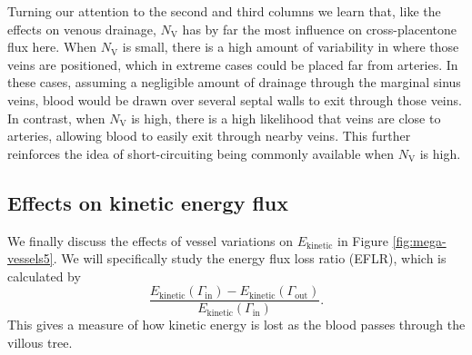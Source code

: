             Turning our attention to the second and third columns we learn that, like the effects on venous drainage, $N_\text{V}$ has by far the most influence on cross-placentone flux here. When $N_\text{V}$ is small, there is a high amount of variability in where those veins are positioned, which in extreme cases could be placed far from arteries. In these cases, assuming a negligible amount of drainage through the marginal sinus veins, blood would be drawn over several septal walls to exit through those veins. In contrast, when $N_\text{V}$ is high, there is a high likelihood that veins are close to arteries, allowing blood to easily exit through nearby veins. This further reinforces the idea of short-circuiting being commonly available when $N_\text{V}$ is high.

        \subsection{Effects on kinetic energy flux}
            We finally discuss the effects of vessel variations on $E_\text{kinetic}$ in Figure \ref{fig:mega-vessels5}. We will specifically study the energy flux loss ratio (EFLR), which is calculated by
            \begin{equation*}
                \frac{E_\text{kinetic}(\Gamma_\text{in}) - E_\text{kinetic}(\Gamma_\text{out})}{E_\text{kinetic}(\Gamma_\text{in})}.
            \end{equation*}
            This gives a measure of how kinetic energy is lost as the blood passes through the villous tree.


